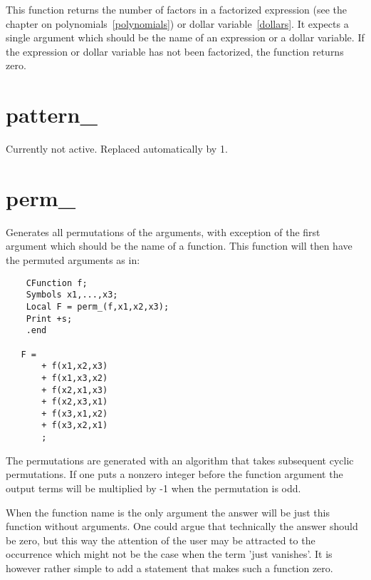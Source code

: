 \noindent This function returns the number of factors in a factorized 
expression (see the chapter on polynomials~\ref{polynomials}) or dollar 
variable~\ref{dollars}. It expects a single argument which should be the 
name of an expression or a dollar variable. If the expression or dollar 
variable has not been factorized, the function returns zero.


\section{pattern\_}
\label{funpattern}
\noindent Currently not active. Replaced automatically by 1.


\section{perm\_}
\label{funperm}
\noindent Generates all permutations of the arguments, with exception 
of the first argument which should be the name of a function. This function 
will then have the permuted arguments as in:
\begin{verbatim}
    CFunction f;
    Symbols x1,...,x3;
    Local F = perm_(f,x1,x2,x3);
    Print +s;
    .end

   F =
       + f(x1,x2,x3)
       + f(x1,x3,x2)
       + f(x2,x1,x3)
       + f(x2,x3,x1)
       + f(x3,x1,x2)
       + f(x3,x2,x1)
       ;
\end{verbatim}
The permutations are generated with an algorithm that takes subsequent 
cyclic permutations. If one puts a nonzero integer before the function 
argument the output terms will be multiplied by -1 when the permutation is 
odd.

When the function name is the only argument the answer will be just this 
function without arguments. One could argue that technically the answer 
should be zero, but this way the attention of the user may be attracted to 
the occurrence which might not be the case when the term 'just vanishes'. 
It is however rather simple to add a statement that makes such a function 
zero.


